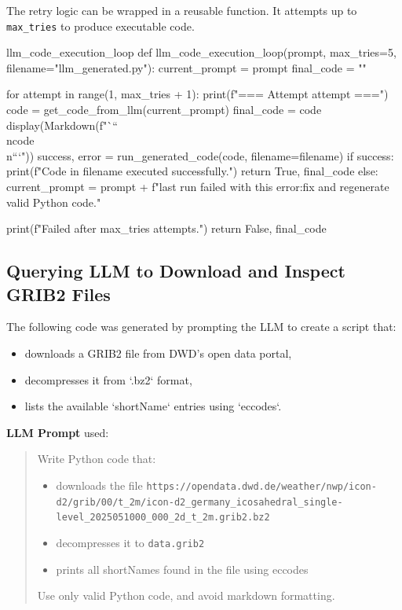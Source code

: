 The retry logic can be wrapped in a reusable function. It attempts up to \texttt{max\_tries} to produce executable code.

\begin{codeonly}{llm\_code\_execution\_loop}
def llm_code_execution_loop(prompt, max_tries=5, filename="llm_generated.py"):
    current_prompt = prompt
    final_code = ""

    for attempt in range(1, max_tries + 1):
        print(f"=== Attempt {attempt} ===")
        code = get_code_from_llm(current_prompt)
        final_code = code
        display(Markdown(f"```\\n{code}\\n```"))
        success, error = run_generated_code(code, filename=filename)
        if success:
            print(f"Code in {filename} executed successfully.")
            return True, final_code
        else:
            current_prompt = prompt + f"\n\nThe last run failed with this error:\n\nPlease fix and regenerate valid Python code."

    print(f"Failed after {max_tries} attempts.")
    return False, final_code
\end{codeonly}

%
\subsection*{Querying LLM to Download and Inspect GRIB2 Files}

The following code was generated by prompting the LLM to create a script that:

\begin{itemize}
  \item downloads a GRIB2 file from DWD's open data portal,
  \item decompresses it from `.bz2` format,
  \item lists the available `shortName` entries using `eccodes`.
\end{itemize}

\textbf{LLM Prompt} used:

\begin{quote}
Write Python code that:
\begin{itemize}
    \item downloads the file \texttt{https://opendata.dwd.de/weather/nwp/icon-d2/grib/00/t\_2m/icon-d2\_germany\_icosahedral\_single-level\_2025051000\_000\_2d\_t\_2m.grib2.bz2}
    \item decompresses it to \texttt{data.grib2}
    \item prints all shortNames found in the file using eccodes
\end{itemize}
Use only valid Python code, and avoid markdown formatting.
\end{quote}

